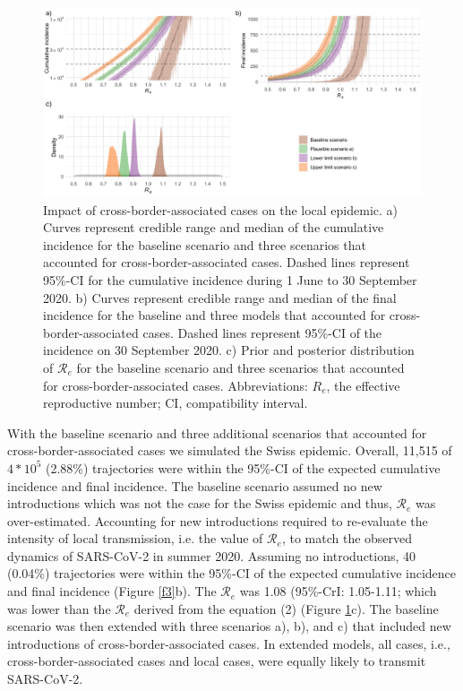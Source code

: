 \documentclass[10pt, a4paper, twoside]{article}
\begin{document}
\begin{multicols}{2}
\begin{figure}
\centering
\includegraphics[scale=0.15]{Figure2_2021-06-02.png}
\caption{Impact of cross-border-associated cases on the local epidemic.
a) Curves represent credible range and median of the cumulative incidence for the baseline scenario and three scenarios that accounted for cross-border-associated cases.
Dashed lines represent 95\%-CI for the cumulative incidence during 1 June to 30 September 2020.
b) Curves represent credible range and median of the final incidence for the baseline and three models that accounted for cross-border-associated cases.
Dashed lines represent 95\%-CI of the incidence on 30 September 2020.
c) Prior and posterior distribution of $\mathcal{R}_e$ for the baseline scenario and three scenarios that accounted for cross-border-associated cases.
Abbreviations: $R_e$, the effective reproductive number; CI, compatibility interval.}

\label{f2}
\end{figure}

With the baseline scenario and three additional scenarios that accounted for cross-border-associated cases we simulated the Swiss epidemic.
Overall, 11,515 of $4*10^5$ (2.88\%) trajectories were within the 95\%-CI of the expected cumulative incidence and final incidence.
The baseline scenario assumed no new introductions which was not the case for the Swiss epidemic and thus, $\mathcal{R}_e$ was over-estimated.
Accounting for new introductions required to re-evaluate the intensity of local transmission, i.e. the value of $\mathcal{R}_e$, to match the observed dynamics of SARS-CoV-2 in summer 2020.
Assuming no introductions, 40 (0.04\%) trajectories were within the 95\%-CI of the expected cumulative incidence and final incidence (Figure \ref{f3}b).
The $\mathcal{R}_e$ was 1.08 (95\%-CrI: 1.05-1.11; which was lower than the $\mathcal{R}_e$ derived from the equation (2) (Figure \ref{f2}c).
The baseline scenario was then extended with three scenarios a), b), and c) that included new introductions of cross-border-associated cases.
In extended models, all cases, i.e., cross-border-associated cases and local cases, were equally likely to transmit SARS-CoV-2.


\end{multicols}
\end{document}
